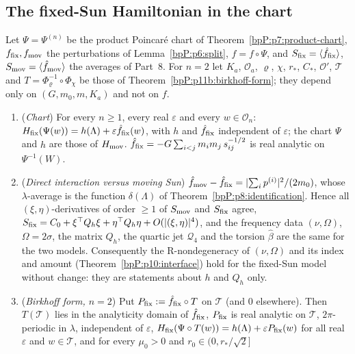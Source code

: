 \subsection{The fixed-Sun Hamiltonian in the chart}\label{bpP:p13:sec-form}

Let $\Psi=\Psi^{(n)}$ be the product Poincar\'e chart of Theorem~\ref{bpP:p7:product-chart}, $f_{\rm fix},f_{\rm mov}$ the perturbations of Lemma~\ref{bpP:p6:split}, $\hat f=f\circ\Psi$, and $S_{\rm fix}=\langle\hat f_{\rm fix}\rangle$, $S_{\rm mov}=\langle\hat f_{\rm mov}\rangle$ the averages of Part~8. For $n=2$ let $K_a$, $\mathcal O_a$, $\varrho$, $\chi$, $r_*$, $C_*$, $\mathcal O'$, $\mathcal T$ and $T=\Phi_\varrho^{-1}\circ\Phi_\chi$ be those of Theorem~\ref{bpP:p11b:birkhoff-form}; they depend only on $(G,m_0,m,K_a)$ and not on $f$.

\begin{proposition}\label{bpP:p13:fixed-hamiltonian-form}
\begin{enumerate}[label=(\alph*)]
\item (\emph{Chart}) For every $n\ge1$, every real $\varepsilon$ and every $w\in\mathcal O_n$: $H_{\rm fix}(\Psi(w))=h(\Lambda)+\varepsilon\hat f_{\rm fix}(w)$, with $h$ and $\hat f_{\rm fix}$ independent of $\varepsilon$; the chart $\Psi$ and $h$ are those of $H_{\rm mov}$. $\hat f_{\rm fix}=-G\sum_{i<j}m_im_j\,s_{ij}^{-1/2}$ is real analytic on $\Psi^{-1}(W)$.
\item (\emph{Direct interaction versus moving Sun}) $\hat f_{\rm mov}-\hat f_{\rm fix}=\lvert \sum_ip^{(i)}\rvert^2/(2m_0)$, whose $\lambda$-average is the function $\delta(\Lambda)$ of Theorem~\ref{bpP:p8:identification}. Hence all $(\xi,\eta)$-derivatives of order $\ge1$ of $S_{\rm mov}$ and $S_{\rm fix}$ agree, $S_{\rm fix}=C_0+\xi^\top Q_h\xi+\eta^\top Q_h\eta+O(\lvert (\xi,\eta)\rvert^4)$, and the frequency data $(\nu,\Omega)$, $\Omega=2\sigma$, the matrix $Q_h$, the quartic jet $\mathcal Q_4$ and the torsion $\hat\beta$ are the same for the two models. Consequently the R-nondegeneracy of $(\nu,\Omega)$ and its index and amount (Theorem~\ref{bpP:p10:interface}) hold for the fixed-Sun model without change: they are statements about $h$ and $Q_h$ only.
\item (\emph{Birkhoff form, $n=2$}) Put $P_{\rm fix}:=\hat f_{\rm fix}\circ T$ on $\mathcal T$ (and $0$ elsewhere). Then $T(\mathcal T)$ lies in the analyticity domain of $\hat f_{\rm fix}$, $P_{\rm fix}$ is real analytic on $\mathcal T$, $2\pi$-periodic in $\lambda$, independent of $\varepsilon$, $H_{\rm fix}(\Psi\circ T(w))=h(\Lambda)+\varepsilon P_{\rm fix}(w)$ for all real $\varepsilon$ and $w\in\mathcal T$, and for every $\mu_0>0$ and $r_0\in(0,r_*/\sqrt2]$

\end{enumerate}
\end{proposition}
